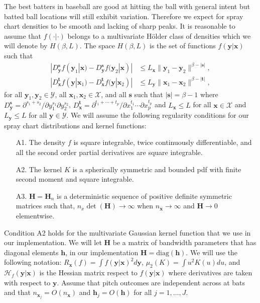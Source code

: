 \documentclass[11pt]{article}
\newcommand{\Y}{\mathcal{Y}}
\newcommand{\X}{\mathcal{X}}
\newcommand{\Hcal}{\mathcal{H}}
\newcommand{\Hbf}{\textbf{H}}
\newcommand{\y}{\textbf{y}}
\newcommand{\x}{\textbf{x}}
\newcommand{\h}{\textbf{h}}
\newcommand{\s}{\textbf{s}}
\newcommand{\tbf}{\textbf{t}}
\DeclareMathOperator{\E}{E}
\DeclareMathOperator{\Var}{Var}
\begin{document}
The best batters in baseball are good at hitting the ball with general intent but batted ball locations will still exhibit variation. Therefore we expect for spray chart densities to be smooth and lacking of sharp peaks. It is reasonable to assume that $f(\cdot|\cdot)$ belongs to a multivariate H{\"o}lder class of densities which we will denote by $H(\beta,L)$. The space $H(\beta,L)$ is the set of functions $f(\y|\x)$ such that 
\begin{align*}
|D_{\y}^\s f(\y_1|\x) - D_{\y}^\s f(\y_2|\x)| &\leq L_\x\|\y_1 - \y_2\|^{\beta - |\s|}, \\
|D_{\x}^\tbf f(\y|\x_1) - D_{\x}^\tbf f(\y|\x_2)| &\leq L_\y\|\x_1 - \x_2\|^{\beta - |\tbf|}, 
\end{align*}
for all $\y_1,\y_2 \in \Y$, all $\x_1,\x_2 \in \X$, and all $\s$ such that $|\s| = \beta - 1$ where
$D_{\y}^\s = \partial^{s_1 + s_2}/\partial y_1^{s_1} \partial y_2^{s_2}$, 
$D_{\x}^\tbf = \partial^{t_1 + \cdots + t_p}/\partial x_1^{t_1} \cdots \partial x_p^{t_p}$ and $L_\x \leq L$ for all $\x \in \X$ and $L_\y \leq L$ for all $\y \in \Y$.
We will assume the following regularity conditions for our spray chart distributions and kernel functions: 

\begin{itemize}
\item[A1.] The density $f$ is square integrable, twice continuously differentiable, and all the second order partial derivatives are square integrable.
\item[A2.] The kernel $K$ is a spherically symmetric and bounded pdf with finite second moment and square integrable.
\item[A3.] $\Hbf = \Hbf_n$ is a deterministic sequence of positive definite symmetric matrices such that, $n_x\det(\Hbf) \to \infty$ when $n_\x \to \infty$ and $\Hbf \to 0$ elementwise. 
\end{itemize}

Condition A2 holds for the multivariate Gaussian kernel function that we use in our implementation.
We will let $\Hbf$ be a matrix of bandwidth parameters that has diagonal elements $\h$, in our implementation $\Hbf = \text{diag}(\h)$. We will use the following notation: $R_{\x}(f) = \int f(\y|\x)^2 d\y$, $\mu_2(K) = \int u^2K(u)du$, and $\Hcal_f(\y|\x)$ is the Hessian matrix respect to $f(\y|\x)$ where derivatives are taken with respect to $\y$. Assume that pitch outcomes are independent across at bats and that $n_{\x_j} = O(n_\x)$ and $\h_j = O(\h)$ for all $j = 1,\ldots,J$. 
\end{document}
